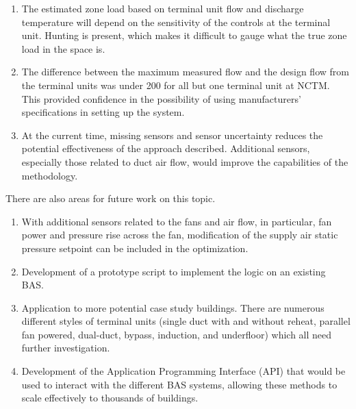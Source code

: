 \begin{enumerate}
    \item The estimated zone load based on terminal unit flow and
        discharge temperature will depend on the sensitivity of the
        controls at the terminal unit. Hunting is present, which makes
        it difficult to gauge what the true zone load in the space is.
    \item The difference between the maximum measured flow and the design flow
        from the terminal units was under \SI{200}{\CFM} for all but one
        terminal unit at NCTM. This provided confidence in the
        possibility of using manufacturers' specifications in setting up
        the system.
    \item At the current time, missing sensors and sensor uncertainty
        reduces the potential effectiveness of the approach described.
        Additional sensors, especially those related to duct air flow,
        would improve the capabilities of the methodology.
\end{enumerate}

There are also areas for future work on this topic.

\begin{enumerate}
    \item With additional sensors related to the fans and air flow, in
        particular, fan power and pressure rise across the fan,
        modification of the supply air static pressure setpoint can be
        included in the optimization.
    \item Development of a prototype script to implement the logic on an
        existing BAS.
    \item Application to more potential case study buildings. There are
        numerous different styles of terminal units (single duct with
        and without reheat, parallel fan powered, dual-duct, bypass,
        induction, and underfloor) which all need
        further investigation. 
    \item Development of the Application Programming Interface (API)
        that would be used to interact with the different BAS systems, allowing
        these methods to scale effectively to thousands of buildings. 
\end{enumerate}

